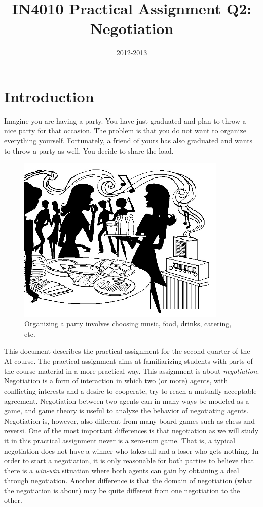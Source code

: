 \documentclass[a4paper]{article}
\begin{document}
 

 
\title{IN4010 Practical Assignment Q2: Negotiation}
\date{2012-2013}
\maketitle

\thispagestyle{empty}


 
\section{Introduction}
\label{sec:introduction}
Imagine you are having a party. You have just graduated and plan to throw a nice party for that occasion. The problem
is that you do not want to organize everything yourself. Fortunately, a friend of
yours has also graduated and wants to throw a party as well. You decide to share
the load.
\begin{figure}[h]
\centering
\includegraphics[width=10cm]{party.jpg}
\caption{Organizing a party involves choosing music, food, drinks, catering, etc.}\label{fig:party}
\end{figure}

This document describes the practical assignment for the second quarter of the AI course. The practical assignment aims at familiarizing students with parts of the course material in a more practical way. This assignment is about {\em negotiation}. Negotiation is a form of interaction in which two (or more) agents, with conflicting interests and a desire to cooperate, try to reach a mutually acceptable agreement. Negotiation between two agents can in many ways be modeled as a game, and game theory is useful to analyze the behavior of negotiating agents. Negotiation is, however, also different from many board games such as chess and reversi. One of the most important differences is that negotiation as we will study it in this practical assignment never is a zero-sum game. That is, a typical negotiation does not have a winner who takes all and a loser who gets nothing. In order to start a negotiation, it is only reasonable for both parties to believe that there is a {\em win-win} situation where both agents can gain by obtaining a deal through negotiation. Another difference is that the domain of negotiation (what the negotiation is about) may be quite different from one negotiation to the other.
\end{document}
